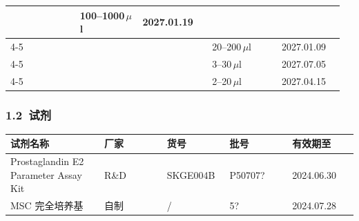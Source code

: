 \documentclass[UTF8,10pt,a4paper,fontset=fandol]{ctexart}
\newcommand{\fieldvalue}[1]{#1}
\newcommand{\handwritten}[1]{#1}
\begin{document}
\begin{tabular}{|p{0.20\linewidth}|p{0.18\linewidth}|p{0.20\linewidth}|p{0.20\linewidth}|p{0.18\linewidth}|}
&
\fieldvalue{\handwritten{100--1000\,\(\mu\)l}} &
\fieldvalue{\handwritten{2027.01.19}}
\\ \cline{4-5}
&
&
&
\fieldvalue{\handwritten{20--200\,\(\mu\)l}} &
\fieldvalue{\handwritten{2027.01.09}}
\\ \cline{4-5}
&
&
&
\fieldvalue{\handwritten{3--30\,\(\mu\)l}} &
\fieldvalue{\handwritten{2027.07.05}}
\\ \cline{4-5}
&
&
&
\fieldvalue{\handwritten{2--20\,\(\mu\)l}} &
\fieldvalue{\handwritten{2027.04.15}}
\\ \hline
\end{tabular}

\subsubsection*{1.2\ 试剂}

\begin{tabular}{|p{0.27\linewidth}|p{0.18\linewidth}|p{0.18\linewidth}|p{0.18\linewidth}|p{0.19\linewidth}|}
\hline
试剂名称 & 厂家 & 货号 & 批号 & 有效期至
\\ \hline
\fieldvalue{Prostaglandin E2 Parameter Assay Kit} &
\fieldvalue{R\&D} &
\fieldvalue{SKGE004B} &
\fieldvalue{\handwritten{P50707?}} &
\fieldvalue{\handwritten{2024.06.30}}
\\ \hline
\fieldvalue{MSC 完全培养基} &
\fieldvalue{自制} &
\fieldvalue{/} &
\fieldvalue{\handwritten{5?}} &
\fieldvalue{\handwritten{2024.07.28}}
\\ \hline
\end{tabular}
\end{document}
